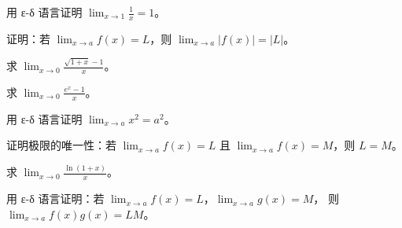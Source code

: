 \begin{exercise}[5]
用 ε-δ 语言证明 \(\displaystyle\lim_{x\to 1} \frac{1}{x}=1\)。
\end{exercise}
\begin{exercise}[5]
证明：若 \(\lim_{x\to a} f(x)=L\)，则 \(\lim_{x\to a} |f(x)|=|L|\)。
\end{exercise}
\begin{exercise}[5]
求 \(\displaystyle\lim_{x\to 0} \frac{\sqrt{1+x}-1}{x}\)。
\end{exercise}
\begin{exercise}[5]
求 \(\displaystyle\lim_{x\to 0} \frac{e^x-1}{x}\)。
\end{exercise}

\begin{exercise}[6]
用 ε-δ 语言证明 \(\displaystyle\lim_{x\to a} x^2=a^2\)。
\end{exercise}
\begin{exercise}[6]
证明极限的唯一性：若 \(\lim_{x\to a} f(x)=L\) 且 \(\lim_{x\to a} f(x)=M\)，则 \(L=M\)。
\end{exercise}
\begin{exercise}[6]
求 \(\displaystyle\lim_{x\to 0} \frac{\ln(1+x)}{x}\)。
\end{exercise}

\begin{exercise}[7]
用 ε-δ 语言证明：若 \(\lim_{x\to a} f(x)=L\)，\(\lim_{x\to a} g(x)=M\)，
则 \(\lim_{x\to a} f(x)g(x)=LM\)。
\end{exercise}

